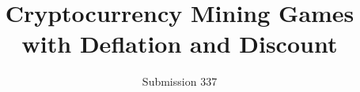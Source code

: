 \documentclass[format=acmsmall, review=false]{acmart}
\begin{document}
\title{Cryptocurrency Mining Games with Deflation and Discount}
\author{Submission 337}



\maketitle

\newpage










\newpage
\onecolumn
\appendix


\end{document}
